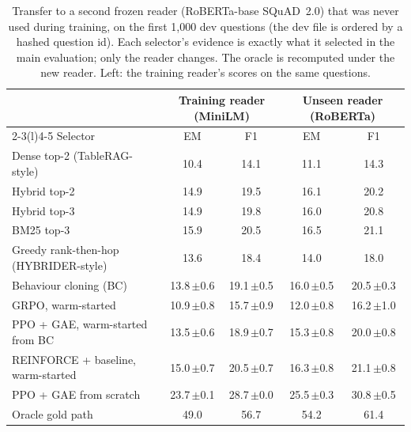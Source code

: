 \begin{table}[t]
\centering
\footnotesize
\caption{Transfer to a second frozen reader (RoBERTa-base SQuAD~2.0) that was never used during training, on the first 1{,}000 dev questions (the dev file is ordered by a hashed question id). Each selector's evidence is exactly what it selected in the main evaluation; only the reader changes. The oracle is recomputed under the new reader. Left: the training reader's scores on the same questions.}
\label{tab:reader}
\begin{tabular}{@{}lcccc@{}}
\toprule
 & \multicolumn{2}{c}{Training reader (MiniLM)} & \multicolumn{2}{c}{Unseen reader (RoBERTa)} \\
\cmidrule(lr){2-3}\cmidrule(l){4-5}
Selector & EM & F1 & EM & F1 \\
\midrule
Dense top-2 (TableRAG-style) & 10.4 & 14.1 & 11.1 & 14.3 \\
Hybrid top-2 & 14.9 & 19.5 & 16.1 & 20.2 \\
Hybrid top-3 & 14.9 & 19.8 & 16.0 & 20.8 \\
BM25 top-3 & 15.9 & 20.5 & 16.5 & 21.1 \\
Greedy rank-then-hop (HYBRIDER-style) & 13.6 & 18.4 & 14.0 & 18.0 \\
Behaviour cloning (BC) & 13.8\,{\scriptsize$\pm$0.6} & 19.1\,{\scriptsize$\pm$0.5} & 16.0\,{\scriptsize$\pm$0.5} & 20.5\,{\scriptsize$\pm$0.3} \\
GRPO, warm-started & 10.9\,{\scriptsize$\pm$0.8} & 15.7\,{\scriptsize$\pm$0.9} & 12.0\,{\scriptsize$\pm$0.8} & 16.2\,{\scriptsize$\pm$1.0} \\
PPO + GAE, warm-started from BC & 13.5\,{\scriptsize$\pm$0.6} & 18.9\,{\scriptsize$\pm$0.7} & 15.3\,{\scriptsize$\pm$0.8} & 20.0\,{\scriptsize$\pm$0.8} \\
REINFORCE + baseline, warm-started & 15.0\,{\scriptsize$\pm$0.7} & 20.5\,{\scriptsize$\pm$0.7} & 16.3\,{\scriptsize$\pm$0.8} & 21.1\,{\scriptsize$\pm$0.8} \\
PPO + GAE from scratch & 23.7\,{\scriptsize$\pm$0.1} & 28.7\,{\scriptsize$\pm$0.0} & 25.5\,{\scriptsize$\pm$0.3} & 30.8\,{\scriptsize$\pm$0.5} \\
Oracle gold path & 49.0 & 56.7 & 54.2 & 61.4 \\
\bottomrule
\end{tabular}
\end{table}
